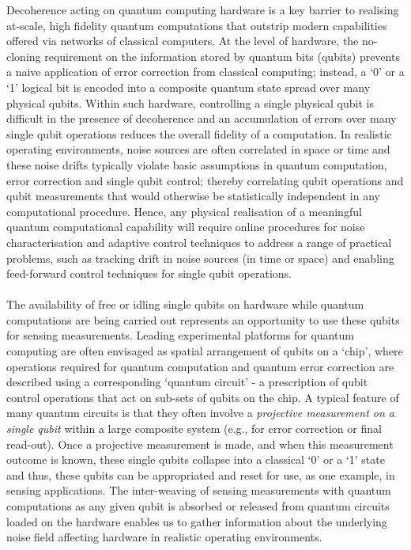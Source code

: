 Decoherence acting on quantum computing hardware is a key barrier to realising at-scale, high fidelity quantum computations that outstrip modern capabilities offered via networks of classical computers. At the level of hardware, the no-cloning requirement on the information stored by quantum bits (qubits) prevents a naive application of error correction from classical computing; instead, a  `0' or a `1' logical bit is encoded into a composite quantum state spread over many physical qubits. Within such hardware,  controlling a single physical qubit is difficult in the presence of decoherence and an accumulation of errors over many single qubit operations reduces the overall fidelity of a computation. In realistic operating environments, noise sources are often correlated in space or time and these noise drifts typically violate basic assumptions in quantum computation, error correction and single qubit control;  thereby correlating qubit operations and qubit measurements that would otherwise be statistically independent in any computational procedure.  Hence, any physical realisation of a meaningful quantum computational capability will require online procedures for noise characterisation and adaptive control techniques to address a range of practical problems, such as tracking drift in noise sources (in time or space) and enabling feed-forward control techniques for single qubit operations. \\
\\
The availability of free or idling single qubits on hardware while quantum computations are being carried out represents an opportunity to use these qubits for sensing measurements.
Leading experimental platforms for quantum computing are often envisaged as spatial arrangement of qubits on a `chip', where operations required for quantum computation and quantum error correction are described using  a corresponding `quantum circuit' - a prescription of qubit control operations that act on sub-sets of qubits on the chip. A typical feature of many quantum circuits is that they often involve a \textit{projective measurement on a single qubit } within a large composite system (e.g., for error correction or final read-out). Once a projective measurement is made, and when this measurement outcome is known, these single qubits collapse into a classical `0' or a `1' state and thus, these qubits can be appropriated and reset for use, as one example, in sensing applications.  The inter-weaving of sensing measurements with quantum computations as any given qubit is absorbed or released from quantum circuits loaded on the hardware enables us to gather information about the underlying noise field affecting hardware in realistic operating environments.\\
